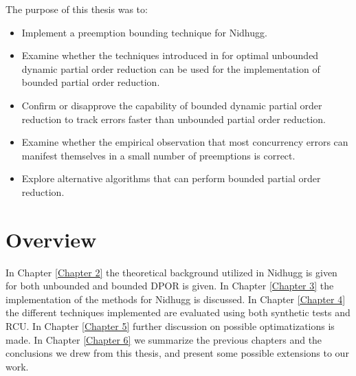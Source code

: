 The purpose of this thesis was to: 
\begin{itemize}
   \item Implement a preemption bounding technique \cite{BPOR} for Nidhugg. 
   \item Examine whether the techniques introduced in \cite{AbdullaAronisJohnssonSagonasDPOR2014} for optimal unbounded dynamic partial order reduction can
   be used for the implementation of bounded partial order reduction.
   \item Confirm or disapprove the capability of bounded dynamic partial order reduction to track errors faster than unbounded partial order reduction.
   \item Examine whether the empirical observation that most concurrency errors can manifest themselves in a small number of preemptions is correct.
   \item Explore alternative algorithms that can perform bounded partial order reduction.
\end{itemize}

\iffalse
The purpose of this thesis is the implementation of a preemption bounding technique \cite{BPOR} for Nidhugg and the combination
of this technique with the a novel technique \cite{AbdullaAronisJohnssonSagonasDPOR2014} suggested for better coverage of the state space.
The bounded-DPOR was used to verify the linux kernel \cite{LinuxKernel} and specifically RCU \cite{Spin}. RCU is a synchronization
mechanism used heavily in Linux kernel, and many of the kernel’s subsystems rely on RCU’s correct operation. By using BPOR the minimum preemptive
switches required to track failure injections were counted. As a result the empirical observation that errors occur in a small bound count was confirmed.
Moreover, the possible application of various optimizations used for unbounded DPOR on bounded DPOR are examined. 
\fi

\section{Overview}
In Chapter \ref{Chapter 2} the theoretical background utilized in Nidhugg is given for both unbounded and bounded DPOR is given.
In Chapter \ref{Chapter 3} the implementation of the methods for Nidhugg is discussed. In Chapter \ref{Chapter 4} the different techniques
implemented are evaluated using both synthetic tests and RCU. In Chapter \ref{Chapter 5} further discussion on possible optimatizations
is made. In Chapter \ref{Chapter 6} we summarize the previous chapters and the conclusions
we drew from this thesis, and present some possible extensions to our work.

